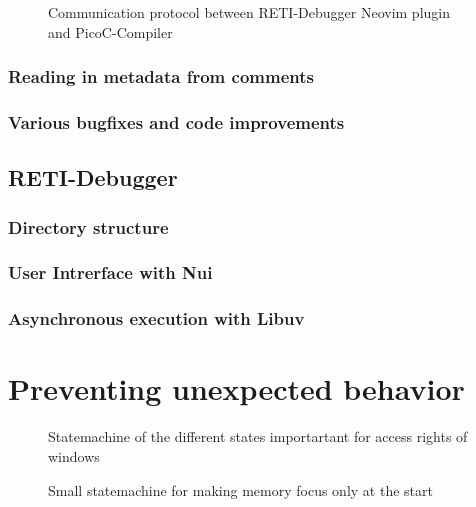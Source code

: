 \documentclass{report}
\begin{document}
\begin{figure}[H]
	\centering
	\caption{Communication protocol between RETI-Debugger Neovim plugin and PicoC-Compiler}
\end{figure}

\subsection{Reading in metadata from comments}

\subsection{Various bugfixes and code improvements}

\section{RETI-Debugger}

\subsection{Directory structure}

\subsection{User Intrerface with Nui}

\subsection{Asynchronous execution with Libuv}

\chapter{Preventing unexpected behavior}

\begin{figure}[H]
	\centering
	\caption{Statemachine of the different states importartant for access rights of windows}
\end{figure}

\begin{figure}[H]
	\centering
	\caption{Small statemachine for making memory focus only at the start}
\end{figure}
\end{document}

